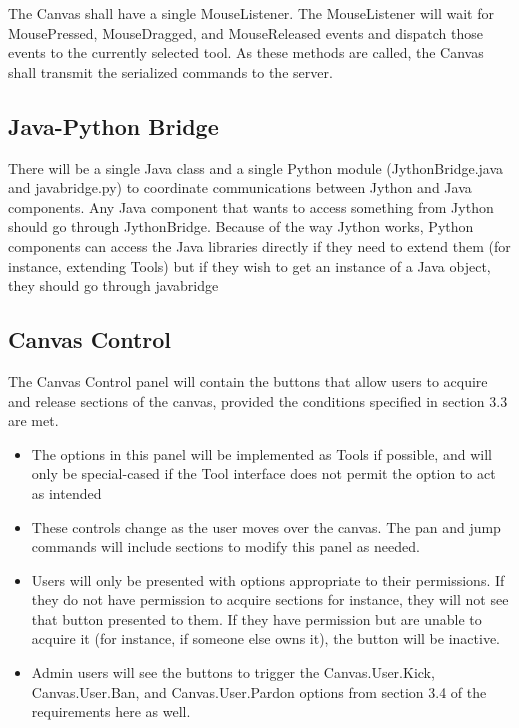 \documentclass[12pt]{article}
\begin{document}
The Canvas shall have a single MouseListener. The MouseListener will wait for
MousePressed, MouseDragged, and MouseReleased events and dispatch those events
to the currently selected tool. As these methods are called, the Canvas shall
transmit the serialized commands to the server.

\subsection{Java-Python Bridge}
      There will be a single Java class and a single Python module (JythonBridge.java and javabridge.py) to coordinate communications between Jython and Java components. Any Java component that wants to access something from Jython should go through JythonBridge. Because of the way Jython works, Python components can access the Java libraries directly if they need to extend them (for instance, extending Tools) but if they wish to get an instance of a Java object, they should go through javabridge
\subsection{Canvas Control}
The Canvas Control panel will contain the buttons that allow users to
     acquire and release sections of the canvas, provided the conditions
     specified in section 3.3 are met.
     \begin{itemize}
     \item
     The options in this panel will be implemented as Tools if possible, and
     will only be special-cased if the Tool interface does not permit the
     option to act as intended
     \item
     These controls change as the user moves over the canvas. The pan and jump
     commands will include sections to modify this panel as needed.
     \item
     Users will only be presented with options appropriate to their
     permissions. If they do not have permission to acquire sections for
     instance, they will not see that button presented to them. If they have
     permission but are unable to acquire it (for instance, if someone else
     owns it), the button will be inactive.
     \item
     Admin users will see the buttons to trigger the Canvas.User.Kick,
     Canvas.User.Ban, and Canvas.User.Pardon options from section 3.4 of the
     requirements here as well.
    \end{itemize}
     
\end{document}
